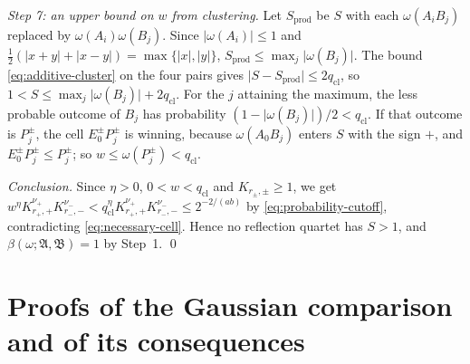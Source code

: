 \documentclass[aps,prl,reprint,longbibliography,raggedbottom]{revtex4-2}
\newcommand{\abs}[1]{\lvert #1\rvert}
\newcommand{\A}{\mathfrak A}
\newcommand{\B}{\mathfrak B}
\begin{document}
\emph{Step 7: an upper bound on $w$ from clustering.} Let
$S_{\mathrm{prod}}$ be $S$ with each $\omega(A_iB_j)$ replaced by
$\omega(A_i)\omega(B_j)$. Since $\abs{\omega(A_i)}\le1$ and
$\frac12(\abs{x+y}+\abs{x-y})=\max\{\abs x,\abs y\}$,
$S_{\mathrm{prod}}\le\max_j\abs{\omega(B_j)}$. The
bound \eqref{eq:additive-cluster} on the four pairs gives
$\abs{S-S_{\mathrm{prod}}}\le2q_{\mathrm{cl}}$, so
$1<S\le\max_j\abs{\omega(B_j)}+2q_{\mathrm{cl}}$. For the $j$
attaining the maximum, the less probable outcome of $B_j$ has
probability $(1-\abs{\omega(B_j)})/2<q_{\mathrm{cl}}$. If that outcome
is $P_j^\pm$,
the cell $E_0^\pm P_j^\pm$ is winning, because $\omega(A_0B_j)$ enters
$S$ with the sign $+$, and $E_0^\pm P_j^\pm\le P_j^\pm$; so
$w\le\omega(P_j^\pm)<q_{\mathrm{cl}}$.

\emph{Conclusion.} Since $\eta>0$, $0<w<q_{\mathrm{cl}}$ and
$K_{r_\pm,\pm}\ge1$, we get
$w^\eta K_{r_+,+}^{\nu_+}K_{r_-,-}^{\nu_-}
<q_{\mathrm{cl}}^\eta K_{r_+,+}^{\nu_+}K_{r_-,-}^{\nu_-}\le2^{-2/(ab)}$
by \eqref{eq:probability-cutoff}, contradicting
\eqref{eq:necessary-cell}. Hence no reflection quartet has $S>1$, and
$\beta(\omega;\A,\B)=1$ by Step~1. \qed

\section{Proofs of the Gaussian comparison and of its consequences}
\label{app:gaussian}
\end{document}
